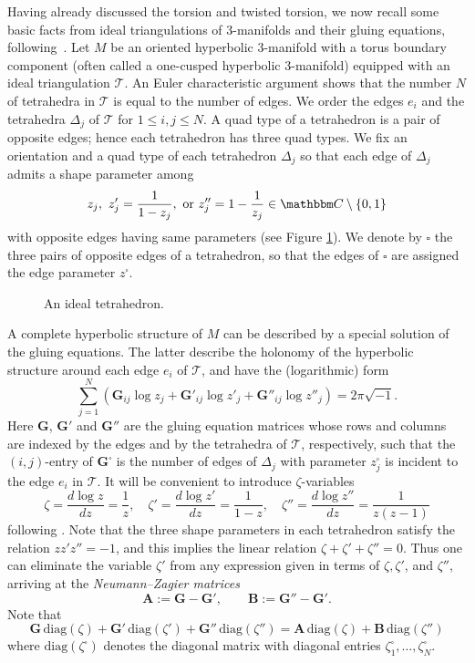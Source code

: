 \documentclass[12pt,reqno]{amsart}
\theoremstyle{definition}
\def\BC{\mathbbm C}
\def\calT{\mathcal T}
\def\be{\begin{equation}}
\def\ee{\end{equation}}
\begin{document}
Having already discussed the torsion and twisted torsion, we now recall some
basic facts from ideal triangulations of 3-manifolds and their gluing equations,
following~\cite{Thurston,NZ}. 
Let $M$ be an oriented hyperbolic 3-manifold with a torus boundary component
(often called a one-cusped hyperbolic 3-manifold) equipped with an ideal triangulation
$\calT$. An Euler characteristic argument shows that the number $N$ of tetrahedra in
$\calT$ is equal to the number of edges. We order the edges $e_i$ and the tetrahedra 
$\Delta_j$ of $\calT$ for $1 \leq i,j \leq N$. A quad type
of a tetrahedron is a pair of opposite edges; hence each tetrahedron has three
quad types. We fix an
orientation and a quad type of each tetrahedron $\Delta_j$ so that each edge of
$\Delta_j$ admits a shape parameter among 
\[z_j, \ z'_j=\frac{1}{1-z_j},\
  \textrm{or } z''_j=1- \frac{1}{z_j} \in \BC \setminus \{0,1\}\]
with opposite edges having same parameters (see Figure \ref{fig.tetrahedron}). 
We denote by $\square$ the three pairs of opposite edges of a tetrahedron,
so that the edges of $\square$ are assigned the edge parameter $z^\square$. 

\begin{figure}[htpb!]

\caption{An ideal tetrahedron.}
\label{fig.tetrahedron}
\end{figure}

A complete hyperbolic structure of $M$ can be described by a special solution
of the gluing equations. The latter describe the holonomy of the hyperbolic structure
around each edge $e_i$ of $\calT$, and have the (logarithmic) form
\be
\label{eqn:gluing}
\sum_{j=1}^N \left(\mathbf{G}_{ij} \log z_j +\mathbf{G}'_{ij} \log z'_j
  +\mathbf{G}''_{ij} \log z''_j\right) = 2\pi \sqrt{-1} .
\ee 
Here $\mathbf{G}$, $\mathbf{G}'$ and $\mathbf{G}''$ are the gluing equation matrices 
whose rows and columns are indexed by the edges and by the tetrahedra of $\calT$,
respectively, such that the $(i,j)$-entry of  $\mathbf{G}^\square$ is the number
of edges of $\Delta_j$ with parameter $z^\square_j$ is incident to the edge $e_i$
in $\calT$. It will be convenient to introduce $\zeta$-variables 
\be
\label{eqn.zeta}
\zeta = \frac{d \log z}{dz}=\frac{1}{z}, \quad
\zeta' = \frac{d \log z'}{dz}=\frac{1}{1-z},\quad
\zeta'' = \frac{d \log z''}{dz}=\frac{1}{z(z-1)} 
\ee
following \cite{siejakowski}. Note that the three shape parameters in each tetrahedron
satisfy the relation $z z' z''=-1$, and this implies the linear relation
$\zeta+\zeta'+\zeta''=0$.
Thus one can eliminate the variable $\zeta'$ from any expression given in terms of
$\zeta, \zeta'$, and $\zeta''$, arriving at the \emph{Neumann--Zagier matrices}
\be
\label{AB}
\mathbf{A}:=\mathbf{G}-\mathbf{G}', \qquad
\mathbf{B}:=\mathbf{G}''-\mathbf{G}'  .
\ee
Note that
\be
\label{3GAB}
\mathbf{G}\, \mathrm{diag}(\zeta)
+\mathbf{G}' \, \mathrm{diag}(\zeta')
+ \mathbf{G}'' \, \mathrm{diag}(\zeta'')
= \mathbf{A}  \, \mathrm{diag}(\zeta) + \mathbf{B} \, \mathrm{diag}(\zeta'') 
\ee
where $\mathrm{diag}(\zeta^\square)$ denotes the diagonal
matrix with diagonal entries $\zeta^\square_1,\ldots,\zeta^\square_N$.
\end{document}
